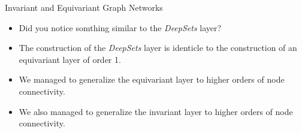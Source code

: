 \documentclass{beamer}
\begin{document}
\begin{frame}{Invariant and Equivariant Graph Networks}
    \begin{itemize}
        \setlength{\itemsep}{\fill}
        \item Did you notice somthing similar to the \emph{DeepSets} layer?
        \item The construction of the \emph{DeepSets} layer is identicle to the construction of an equivariant layer of order 1.
        \item We managed to generalize the equivariant layer to higher orders of node connectivity.
        \item We also managed to generalize the invariant layer to higher orders of node connectivity.
    \end{itemize}
\end{frame}
\end{document}
